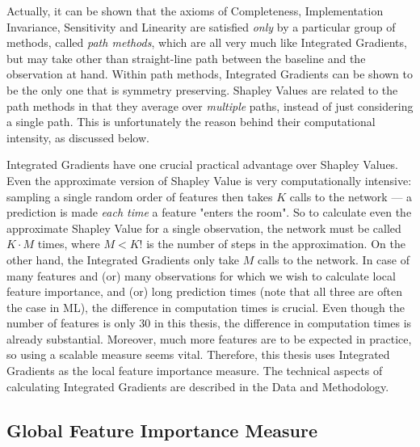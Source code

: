 {			Actually, it can be shown \citep{sundararajan2017axiomatic} that the axioms of Completeness, Implementation Invariance, Sensitivity and Linearity are satisfied \textit{only} by a particular group of methods, called \textit{path methods}, which are all very much like Integrated Gradients, but may take other than straight-line path between the baseline and the observation at hand. Within path methods, Integrated Gradients can be shown \citep{sundararajan2017axiomatic} to be the only one that is symmetry preserving. Shapley Values are related to the path methods in that they average over \textit{multiple} paths, instead of just considering a single path. This is unfortunately the reason behind their computational intensity, as discussed below.  
			
			Integrated Gradients have one crucial practical advantage over Shapley Values. Even the approximate version of Shapley Value \citep{vstrumbelj2014explaining} is very computationally intensive: sampling a single random order of features then takes $K$ calls to the network --- a prediction is made \textit{each time} a feature "enters the room". So to calculate even the approximate Shapley Value for a single observation, the network must be called $K\cdot M$ times, where $M < K!$ is the number of steps in the approximation. On the other hand, the Integrated Gradients only take $M$ calls to the network. In case of many features and (or) many observations for which we wish to calculate local feature importance, and (or) long prediction times (note that all three are often the case in ML), the difference in computation times is crucial. Even though the number of features is only 30 in this thesis, the difference in computation times is already substantial. Moreover, much more features are to be expected in practice, so using a scalable measure seems vital. Therefore, this thesis uses Integrated Gradients as the local feature importance measure. The technical aspects of calculating Integrated Gradients are described in the Data and Methodology. 
		
		
		\subsection{Global Feature Importance Measure} 
		
}
